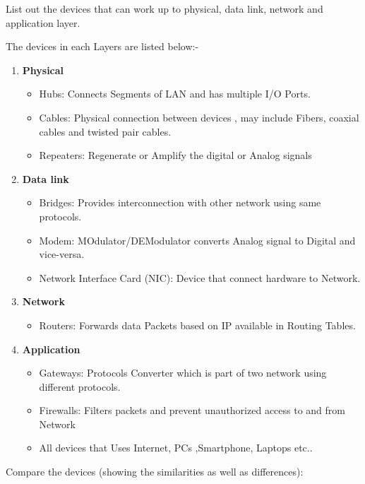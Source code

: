\documentclass[a4paper,12pt]{article}
\begin{document}
\begin{Q}
    {
        List out the devices that can work up to physical, data link, network and application layer.
    }
\end{Q}

\begin{A}
    {
        The devices in each Layers are listed below:-
\begin{enumerate}
    \item \textbf{Physical}
    \begin{itemize}
        \item Hubs: Connects Segments of LAN and has multiple I/O Ports.
        \item Cables: Physical connection between devices , may include Fibers, coaxial cables and twisted pair cables.
        \item Repeaters: Regenerate or Amplify the digital or Analog signals
    \end{itemize}

    \item \textbf{Data link}
    \begin{itemize}
        \item Bridges: Provides interconnection with other network using same protocols.
        \item Modem: MOdulator/DEModulator converts Analog signal to Digital and vice-versa.
        \item  Network Interface Card (NIC): Device that connect hardware to Network.
    \end{itemize}
    
    \item \textbf{Network}
    \begin{itemize}
        \item Routers: Forwards data Packets based on IP available in Routing Tables.
    \end{itemize}
    
    \item \textbf{Application}
    \begin{itemize}
        \item Gateways: Protocols Converter which is part of two network using different protocols.
        \item Firewalls: Filters packets and prevent unauthorized access to and from Network
        \item All devices that Uses Internet, PCs ,Smartphone, Laptops etc..
    \end{itemize}
    
\end{enumerate}
    }
\end{A}
\pagebreak
\begin{Q}
    {
        Compare the devices (showing the similarities as well as differences):
    }
\end{Q}
\end{document}
